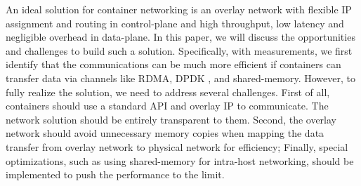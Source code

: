An ideal solution for container networking is an overlay network with flexible
IP assignment and routing in control-plane and high 
throughput, low latency and negligible overhead in data-plane. In this paper, we 
will discuss the opportunities and challenges to build such a solution. 
Specifically, with measurements, we first identify that the communications 
can be much more efficient if containers can transfer data via channels like
RDMA, DPDK , and shared-memory. However, to fully
realize the solution, we need to address several challenges. First of all, 
containers should use a standard API and overlay IP to communicate. The network
solution should be entirely transparent to them. Second, the overlay network
should avoid unnecessary memory copies when mapping the data transfer from
overlay network to physical network for efficiency; Finally, special optimizations, such as using shared-memory for intra-host networking, should be
implemented to push the performance to the limit.
